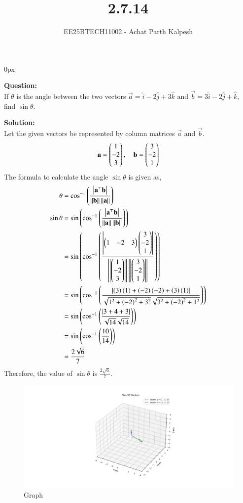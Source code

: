 \documentclass[journal]{IEEEtran}
\begin{document}

\title{2.7.14}
\author{EE25BTECH11002 - Achat Parth Kalpesh }
{\let\newpage\relax\maketitle}
\renewcommand{\thefigure}{\theenumi}
\renewcommand{\thetable}{\theenumi}
\setlength{\intextsep}{10pt} %
\renewcommand{\thetable}{\theenumi}
\parindent 0px



\textbf{Question:}\\
If $\theta$ is the angle between the two vectors $\vec{a} = \hat{i} - 2\hat{j} + 3\hat{k}$ and $\vec{b} = 3\hat{i} - 2\hat{j} + \hat{k}$, find $\sin \theta$.

\textbf{Solution:}\\
Let the given vectors be represented by column matrices $\vec{a}$ and $\vec{b}$.
\begin{align}
    \mathbf{a} = \begin{pmatrix}1 \\ -2 \\ 3\end{pmatrix}, \quad \mathbf{b} = \begin{pmatrix}3 \\ -2 \\ 1\end{pmatrix}
\end{align}
The formula to calculate the angle $\sin\theta$ is given as,
\begin{align}
    \theta &= \cos^{-1}\left(\frac{\left\vert\mathbf{a}^\top\mathbf{b}\right\vert}{\left\lVert\mathbf{b}\right\rVert \left\lVert\mathbf{a}\right\rVert}\right)\\
    \sin\theta &= \sin\left(\cos^{-1}\left(\frac{\left\vert\mathbf{a}^\top\mathbf{b}\right\vert}{\left\lVert\mathbf{a}\right\rVert \left\lVert\mathbf{b}\right\rVert}\right)\right)\\
    &= \sin\left(\cos^{-1}\left(\frac{\left\vert\begin{pmatrix}1&-2&3\end{pmatrix}\begin{pmatrix}3\\-2\\1\end{pmatrix}\right\vert}{\left\lVert\begin{pmatrix}1\\-2\\3\end{pmatrix}\right\rVert\left\lVert\begin{pmatrix}3\\-2\\1\end{pmatrix}\right\rVert}\right)\right) \\
    &= \sin\left(\cos^{-1} \left(\frac{\left\vert\left(3\right)\left(1\right) + \left(-2\right)\left(-2\right) + \left(3\right)\left(1\right)\right\vert}{\sqrt{1^2 + \left(-2\right)^2 + 3^2}\sqrt{3^2 + \left(-2\right)^2 + 1^2}}\right)\right) \\
    &= \sin\left(\cos^{-1}\left(\frac{\left\vert3+4+3\right\vert}{\sqrt{14}\sqrt{14}}\right)\right)\\
    &= \sin\left(\cos^{-1}\left(\frac{10}{14}\right)\right)\\
    &= \frac{2\sqrt{6}}{7}
\end{align}
Therefore, the value of $\sin \theta$ is $\frac{2\sqrt{6}}{7}$.

\begin{figure}[h]
    \centering
    \includegraphics[width=\columnwidth]{figs/pure_python.png}
    \caption{Graph}
    \label{fig:fig}
 \end{figure}
\end{document}
